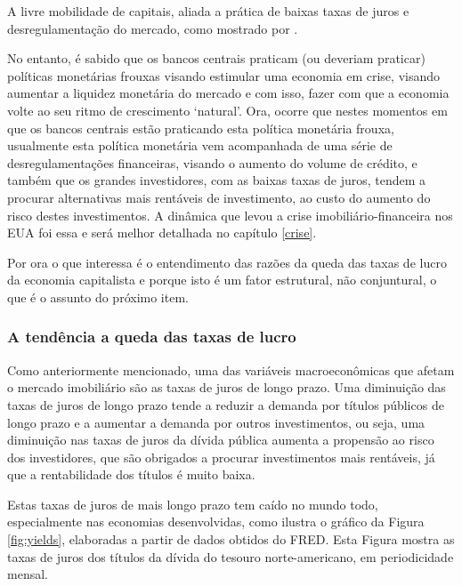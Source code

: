 \documentclass[
	12pt,				%
	oneside,			%
	a4paper,			%
	chapter=TITLE,		%
	section=TITLE,		%
	english,			%
	brazil				%
	]{abntex2}
\begin{document}
\begin{refsection}
A livre mobilidade de capitais, aliada a prática de baixas taxas de juros e
desregulamentação do mercado, como mostrado por \autocite{estonia}.

No entanto, é sabido que os bancos centrais praticam (ou deveriam praticar)
políticas monetárias frouxas visando estimular uma economia em crise, visando
aumentar a liquidez monetária do mercado e com isso, fazer com que a economia
volte ao seu ritmo de crescimento `natural'. Ora, ocorre que nestes momentos em
que os bancos centrais estão praticando esta política monetária frouxa,
usualmente esta política monetária vem acompanhada de uma série de
desregulamentações financeiras, visando o aumento do volume de crédito, e também
que os grandes investidores, com as baixas taxas de juros, tendem a procurar
alternativas mais rentáveis de investimento, ao custo do aumento do risco destes
investimentos. A dinâmica que levou a crise imobiliário-financeira nos \gls{EUA}
foi essa e será melhor detalhada no capítulo \ref{crise}.

Por ora o que interessa é o entendimento das razões da queda das taxas de lucro
da economia capitalista e porque isto é um fator estrutural, não conjuntural, o
que é o assunto do próximo item.

\hypertarget{a-tenduxeancia-a-queda-das-taxas-de-lucro}{%
\subsubsection{A tendência a queda das taxas de lucro}\label{a-tenduxeancia-a-queda-das-taxas-de-lucro}}

Como anteriormente mencionado, uma das variáveis macroeconômicas que afetam o
mercado imobiliário são as taxas de juros de longo prazo. Uma diminuição das
taxas de juros de longo prazo tende a reduzir a demanda por títulos públicos de
longo prazo e a aumentar a demanda por outros investimentos, ou seja, uma
diminuição nas taxas de juros da dívida pública aumenta a propensão ao risco dos
investidores, que são obrigados a procurar investimentos mais rentáveis, já que
a rentabilidade dos títulos é muito baixa.

Estas taxas de juros de mais longo prazo tem caído no mundo todo, especialmente
nas economias desenvolvidas, como ilustra o gráfico da Figura \ref{fig:yields},
elaboradas a partir de dados obtidos do \gls{FRED}. Esta Figura mostra as taxas
de juros dos títulos da dívida do tesouro norte-americano, em periodicidade
mensal.


\end{refsection}
\end{document}
